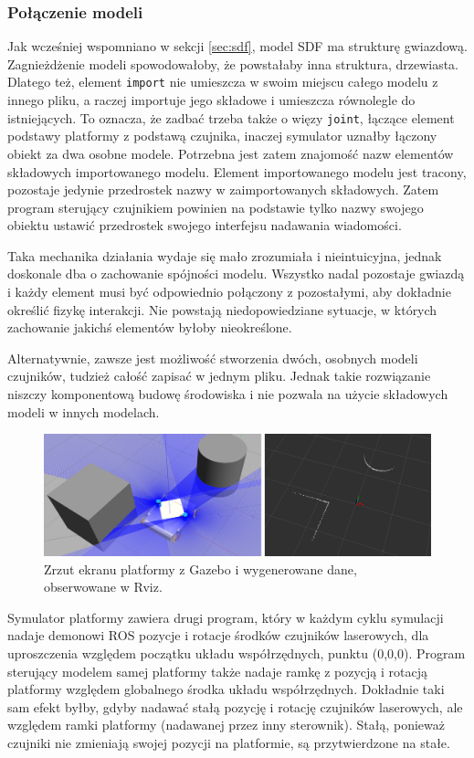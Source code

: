 		\subsubsection{Połączenie modeli}
			Jak wcześniej wspomniano w sekcji \ref{sec:sdf},
			model SDF ma strukturę gwiazdową. 
			Zagnieżdżenie modeli spowodowałoby, że powstałaby inna struktura, drzewiasta.
			Dlatego też, element \texttt{import} nie umieszcza w swoim miejscu całego modelu z innego pliku, a raczej importuje jego składowe i umieszcza równolegle do istniejących.
			To oznacza, że zadbać trzeba także o więzy \texttt{joint}, łączące element podstawy platformy z podstawą czujnika, inaczej symulator uznałby łączony obiekt za dwa osobne modele.
			Potrzebna jest zatem znajomość nazw elementów składowych importowanego modelu.
			Element importowanego modelu jest tracony, pozostaje jedynie przedrostek nazwy w zaimportowanych składowych.
			Zatem program sterujący czujnikiem powinien na podstawie tylko nazwy swojego obiektu ustawić przedrostek swojego interfejsu nadawania wiadomości.

			Taka mechanika działania wydaje się mało zrozumiała i nieintuicyjna, jednak doskonale dba o zachowanie spójności modelu.
			Wszystko nadal pozostaje gwiazdą i każdy element musi być odpowiednio połączony z pozostałymi, aby dokładnie określić fizykę interakcji.
			Nie powstają niedopowiedziane sytuacje, w których zachowanie jakichś elementów byłoby nieokreślone.

			Alternatywnie, zawsze jest możliwość stworzenia dwóch, osobnych modeli czujników, tudzież całość zapisać w jednym pliku.
			Jednak takie rozwiązanie niszczy komponentową budowę środowiska i nie pozwala na użycie składowych modeli w innych modelach.
			
			\begin{figure}[h]
			\centering
			\includegraphics[width=\textwidth]{graphics/scan.png}
			\caption{Zrzut ekranu platformy z Gazebo i wygenerowane dane, obserwowane w Rviz.}
			\label{fig:scan}
			\end{figure}
			
		Symulator platformy zawiera drugi program, który w każdym cyklu symulacji nadaje demonowi ROS pozycje i rotacje środków czujników laserowych, dla uproszczenia
	względem początku układu współrzędnych, punktu (0,0,0). 
	Program sterujący modelem samej platformy także nadaje ramkę z pozycją i rotacją platformy względem globalnego środka układu współrzędnych.
	Dokładnie taki sam efekt byłby, gdyby nadawać stałą pozycję i rotację czujników laserowych, ale względem ramki platformy (nadawanej przez inny sterownik).
	Stałą, ponieważ czujniki nie zmieniają swojej pozycji na platformie, są przytwierdzone na stałe.
	

